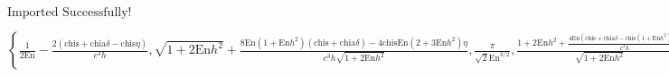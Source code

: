\documentclass{article}
\begin{document}
\noindent\(\text{Imported Successfully!}\)

\begin{doublespace}
\noindent\(\left\{\frac{1}{2 \text{En}}-\frac{2 (\text{chis}+\text{chia} \delta -\text{chis} \eta )}{c^3 h},\sqrt{1+2 \text{En} h^2}+\frac{8 \text{En}
\left(1+\text{En} h^2\right) (\text{chis}+\text{chia} \delta )-4 \text{chis} \text{En} \left(2+3 \text{En} h^2\right) \eta }{c^3 h \sqrt{1+2 \text{En}
h^2}},\frac{\pi }{\sqrt{2} \text{En}^{3/2}},\frac{1+2 \text{En} h^2+\frac{4 \text{En} \left(\text{chis}+\text{chia} \delta -\text{chis} \left(1+\text{En}
h^2\right) \eta \right)}{c^3 h}}{\sqrt{1+2 \text{En} h^2}},2 \pi +\frac{4 \pi  (-2 \text{chia} \delta +\text{chis} (-2+\eta ))}{c^3 h^3},\sqrt{1+2
\text{En} h^2}+\frac{4 \text{En} \left(1+\text{En} h^2\right) (2 \text{chia} \delta -\text{chis} (-2+\eta ))}{c^3 h \sqrt{1+2 \text{En} h^2}}\right\}\)
\end{doublespace}
\end{document}
